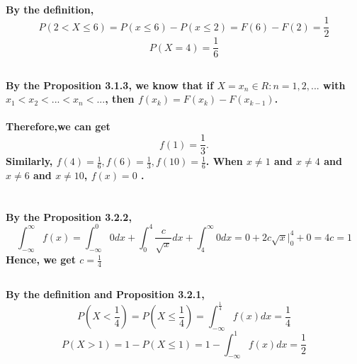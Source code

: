 \documentclass{article}
\begin{document}
            \paragraph{
                By the definition,
                $$P(2<X\leq 6)=P(x\leq 6)-P(x\leq 2)=F(6)-F(2)=\frac{1}{2}$$
                $$P(X=4)=\frac{1}{6}$$
            }
        \subsection{}
            \paragraph{
                By the Proposition 3.1.3, we know that if $X={x_n \in R:n=1,2,...}$ with $x_1<x_2<...<x_n<...$, then $f(x_k)=F(x_k)-F(x_{k-1})$.
            }
            \paragraph{
                Therefore,we can get 
                $$f(1)=\frac{1}{3}.$$
                Similarly, $f(4)=\frac{1}{6},f(6)=\frac{1}{3},f(10)=\frac{1}{6}$.  When $x\neq 1$ and $x\neq 4$ and $x\neq 6$ and $x\neq 10$,
                $f(x)=0$ .
            }
    \section{}
        \subsection{}
            \paragraph{
                By the Proposition 3.2.2,
                $$\int _{-\infty} ^\infty f(x)=\int _{-\infty} ^0 0 dx +\int _ 0 ^4 \frac{c}{\sqrt{x}} dx + \int _4 ^\infty 0 dx=0+ 2c\sqrt{x}| _0 ^4 +0=4c=1$$
                Hence, we get $c=\frac{1}{4}$
            }
        \subsection{}
            \paragraph{
                By the definition and Proposition 3.2.1,
                $$P(X<\frac{1}{4})=P(X\leq\frac{1}{4})=\int _{-\infty}  ^\frac{1}{4}f(x)dx=\frac{1}{4}$$
                $$P(X>1)=1-P(X\leq 1)=1-\int _{-\infty}  ^1f(x)dx=\frac{1}{2}$$
            }
\end{document}
